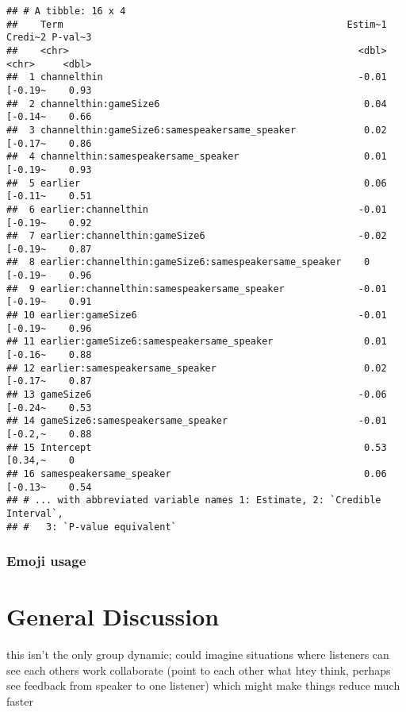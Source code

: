 \documentclass[
  english,
  a4paper,
]{article}
\begin{document}
\begin{verbatim}
## # A tibble: 16 x 4
##    Term                                                  Estim~1 Credi~2 P-val~3
##    <chr>                                                   <dbl> <chr>     <dbl>
##  1 channelthin                                             -0.01 [-0.19~    0.93
##  2 channelthin:gameSize6                                    0.04 [-0.14~    0.66
##  3 channelthin:gameSize6:samespeakersame_speaker            0.02 [-0.17~    0.86
##  4 channelthin:samespeakersame_speaker                      0.01 [-0.19~    0.93
##  5 earlier                                                  0.06 [-0.11~    0.51
##  6 earlier:channelthin                                     -0.01 [-0.19~    0.92
##  7 earlier:channelthin:gameSize6                           -0.02 [-0.19~    0.87
##  8 earlier:channelthin:gameSize6:samespeakersame_speaker    0    [-0.19~    0.96
##  9 earlier:channelthin:samespeakersame_speaker             -0.01 [-0.19~    0.91
## 10 earlier:gameSize6                                       -0.01 [-0.19~    0.96
## 11 earlier:gameSize6:samespeakersame_speaker                0.01 [-0.16~    0.88
## 12 earlier:samespeakersame_speaker                          0.02 [-0.17~    0.87
## 13 gameSize6                                               -0.06 [-0.24~    0.53
## 14 gameSize6:samespeakersame_speaker                       -0.01 [-0.2,~    0.88
## 15 Intercept                                                0.53 [0.34,~    0   
## 16 samespeakersame_speaker                                  0.06 [-0.13~    0.54
## # ... with abbreviated variable names 1: Estimate, 2: `Credible Interval`,
## #   3: `P-value equivalent`
\end{verbatim}

\hypertarget{emoji-usage-1}{%
\subsubsection{Emoji usage}\label{emoji-usage-1}}

\hypertarget{general-discussion}{%
\section{General Discussion}\label{general-discussion}}

this isn't the only group dynamic; could imagine situations where listeners can see each others work collaborate (point to each other what htey think, perhaps see feedback from speaker to one listener) which might make things reduce much faster
\end{document}
